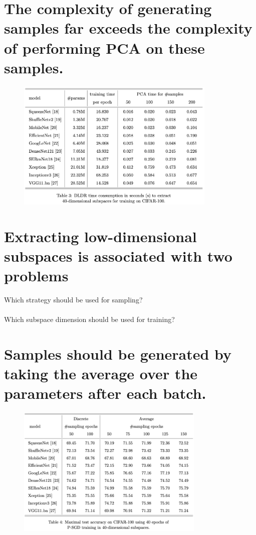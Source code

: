 \documentclass[t]{beamer}
\begin{document}
\section{The complexity of generating samples far exceeds the complexity of performing PCA on these samples.}
\begin{frame}
\begin{figure}
\includegraphics[width=0.85\textwidth]{exp-3}
\end{figure}
\end{frame}

\section{Extracting low-dimensional subspaces is associated with two problems}
\begin{frame}
\centering
\vspace{5cm}
Which strategy should be used for sampling? \\ \ \\
Which subspace dimension should be used for training?
\end{frame}

\section{Samples should be generated by taking the average over the parameters after each batch.}
\begin{frame}
\begin{figure}
\includegraphics[width=0.8\textwidth]{exp-4}
\end{figure}
\end{frame}
\end{document}
